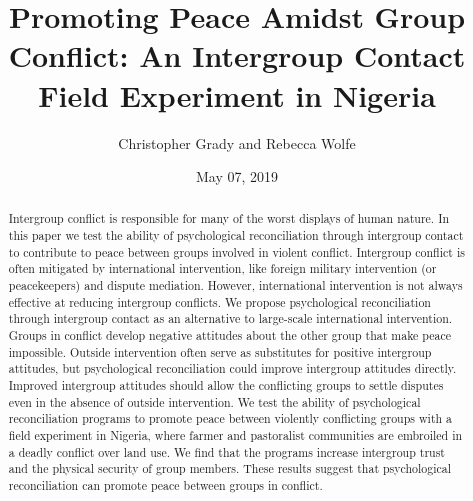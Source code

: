\documentclass[11pt]{article}
\title{Promoting Peace Amidst Group Conflict: An Intergroup Contact Field
Experiment in Nigeria}
\author{
Christopher Grady and Rebecca Wolfe
}
\date{May 07, 2019}
\begin{document}
\VerbatimFootnotes

%
%
%
%
%
%
%
%
%
%

\maketitle

\begin{abstract}

Intergroup conflict is responsible for many of the worst displays of human nature.  In this paper we test the ability of psychological reconciliation through intergroup contact to contribute to peace between groups involved in violent conflict.  Intergroup conflict is often mitigated by international intervention, like foreign military intervention (or peacekeepers) and dispute mediation.  However, international intervention is not always effective at reducing intergroup conflicts.  We propose psychological reconciliation through intergroup contact as an alternative to large-scale international intervention.  Groups in conflict develop negative attitudes about the other group that make peace impossible.  Outside intervention often serve as substitutes for positive intergroup attitudes, but psychological reconciliation could improve intergroup attitudes directly.  Improved intergroup attitudes should allow the conflicting groups to settle disputes even in the absence of outside intervention.  We test the ability of psychological reconciliation programs to promote peace between violently conflicting groups with a field experiment in Nigeria, where farmer and pastoralist communities are embroiled in a deadly conflict over land use.  We find that the programs increase intergroup trust and the physical security of group members.  These results suggest that psychological reconciliation can promote peace between groups in conflict.

\end{abstract}
\end{document}
